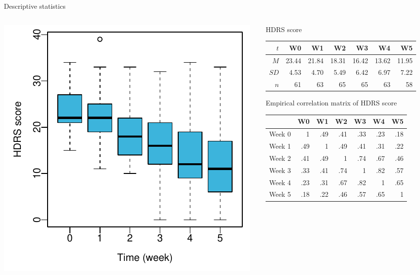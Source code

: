 \documentclass[aspectratio=169]{beamer}
\begin{document}
\begin{frame}{Descriptive statistics}
\begin{columns}
\begin{column}{.55\textwidth}
  \includegraphics[scale=.8]{../figures/hdrs-box}
\end{column}
\begin{column}{.6\textwidth}
  HDRS score\\[1ex]
  {\footnotesize
\begin{tabular}{rrrrrrr}
  \hline
  $t$ & W0 & W1 & W2 & W3 & W4 & W5 \\ 
  \hline
  $M$  & 23.44 & 21.84 & 18.31 & 16.42 & 13.62 & 11.95 \\ 
  $SD$ &  4.53 & 4.70  & 5.49  & 6.42  & 6.97  & 7.22 \\ 
  $n$  & 61    & 63    & 65    & 65    & 63    & 58    \\ 
  \hline
\end{tabular}
  }

  \vspace{.5cm}
  Empirical correlation matrix of HDRS score\\[1ex]
  {\footnotesize
\begin{tabular}{rrrrrrr}
  \hline
   & W0 & W1 & W2 & W3 & W4 & W5 \\ 
  \hline
  Week 0 &   1 & .49 & .41 & .33 & .23 & .18 \\ 
  Week 1 & .49 &   1 & .49 & .41 & .31 & .22 \\ 
  Week 2 & .41 & .49 &   1 & .74 & .67 & .46 \\ 
  Week 3 & .33 & .41 & .74 &   1 & .82 & .57 \\ 
  Week 4 & .23 & .31 & .67 & .82 &   1 & .65 \\ 
  Week 5 & .18 & .22 & .46 & .57 & .65 &   1 \\ 
  \hline
\end{tabular}
  }


\end{column}
\end{columns}
\end{frame}
\end{document}
